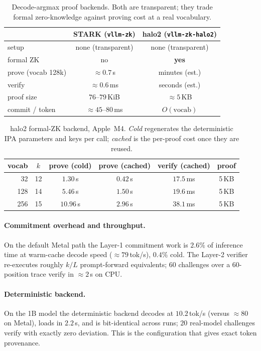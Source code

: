 \documentclass[11pt]{article}
\newcommand{\code}[1]{\texttt{#1}}
\begin{document}
\begin{table}[t]
\centering
\small
\begin{tabular}{lcc}
\toprule
 & STARK (\code{vllm-zk}) & halo2 (\code{vllm-zk-halo2})\\
\midrule
setup & none (transparent) & none (transparent)\\
formal ZK & no & \textbf{yes}\\
prove (vocab 128k) & ${\approx}0.7$\,s & minutes (est.)\\
verify & ${\approx}0.6$\,ms & seconds (est.)\\
proof size & $76$--$79$\,KiB & ${\approx}5$\,KB\\
commit / token & ${\approx}45$--$80$\,ms & $O(\text{vocab})$\\
\bottomrule
\end{tabular}
\caption{Decode-argmax proof backends. Both are transparent; they trade formal
zero-knowledge against proving cost at a real vocabulary.}
\label{tab:l3}
\end{table}

\begin{table}[t]
\centering
\small
\begin{tabular}{rccccc}
\toprule
vocab & $k$ & prove (cold) & prove (cached) & verify (cached) & proof\\
\midrule
32  & 12 & $1.30$\,s  & $0.42$\,s & $17.5$\,ms & 5\,KB\\
128 & 14 & $5.46$\,s  & $1.50$\,s & $19.6$\,ms & 5\,KB\\
256 & 15 & $10.96$\,s & $2.96$\,s & $38.1$\,ms & 5\,KB\\
\bottomrule
\end{tabular}
\caption{halo2 formal-ZK backend, Apple~M4. \emph{Cold} regenerates the
deterministic IPA parameters and keys per call; \emph{cached} is the per-proof
cost once they are reused.}
\label{tab:halo2}
\end{table}

\paragraph{Commitment overhead and throughput.} On the default Metal path the
Layer-1 commitment work is $2.6\%$ of inference time at warm-cache decode speed
(${\approx}79$\,tok/s), $0.4\%$ cold. The Layer-2 verifier re-executes roughly
$k/L$ prompt-forward equivalents; $60$ challenges over a $60$-position trace
verify in ${\approx}2$\,s on CPU.

\paragraph{Deterministic backend.} On the 1B model the deterministic backend
decodes at $10.2$\,tok/s (versus ${\approx}80$ on Metal), loads in $2.2$\,s, and
is bit-identical across runs; $20$ real-model challenges verify with exactly
zero deviation. This is the configuration that gives exact token provenance.
\end{document}
